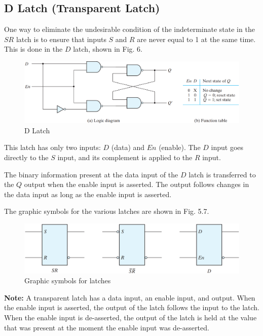 \subsection{D Latch (Transparent Latch)}
\label{subsec:d-latch}

One way to eliminate the undesirable condition of the indeterminate state in the $SR$ latch is to ensure that inputs $S$ and $R$ are never equal to 1 at the same time. This is done in the $D$ latch, shown in Fig. 6. 
\begin{figure}[H]
  \centering
  \includegraphics[width=\linewidth]{img/fig-5.6.png}
  \caption{D Latch}
  \label{fig:5.6}
\end{figure}
\noindent This latch has only two inputs: $D$ (data) and $En$ (enable). The $D$ input goes directly to the $S$ input, and its complement is applied to the $R$ input. 

The binary information present at the data input of the $D$ latch is transferred to the $Q$ output when the enable input is asserted. The output follows changes in the data input as long as the enable input is asserted.

The graphic symbols for the various latches are shown in Fig. 5.7.
\begin{figure}[H]
  \centering
  \includegraphics[width=\linewidth]{img/fig-5.7.png}
  \caption{Graphic symbols for latches}
  \label{fig:5.7}
\end{figure}

\textbf{Note:} A transparent latch has a data input, an enable input, and output. When the enable input is asserted, the output of the latch follows the input to the latch. When the enable input is de-asserted, the output of the latch is held at the value that was present at the moment the enable input was de-asserted.
